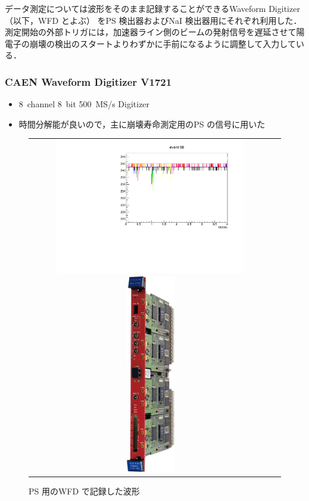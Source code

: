 データ測定については波形をそのまま記録することができるWaveform Digitizer （以下，WFD とよぶ） をPS 検出器およびNaI 検出器用にそれぞれ利用した．測定開始の外部トリガには，加速器ライン側のビームの発射信号を遅延させて陽電子の崩壊の検出のスタートよりわずかに手前になるように調整して入力している．

\subsubsection{CAEN Waveform Digitizer V1721}
\begin{itemize}
\item 8~channel 8~bit 500~MS/s Digitizer
\item 時間分解能が良いので，主に崩壊寿命測定用のPS の信号に用いた
\end{itemize}
\begin{figure}[H]
\begin{tabular}{cc}
\begin{minipage}{0.5\hsize}
\centering
\includegraphics[width=0.8\textwidth,angle=-90]{figure/hayakawa/ps_plot.pdf}
\caption{PS 用のWFD で記録した波形}
\end{minipage}
\begin{minipage}{0.4\hsize}
\centering
\includegraphics[width=0.2\textwidth]{figure/hayakawa/1095_L.jpg}
\end{minipage}
\end{tabular}
\end{figure}

